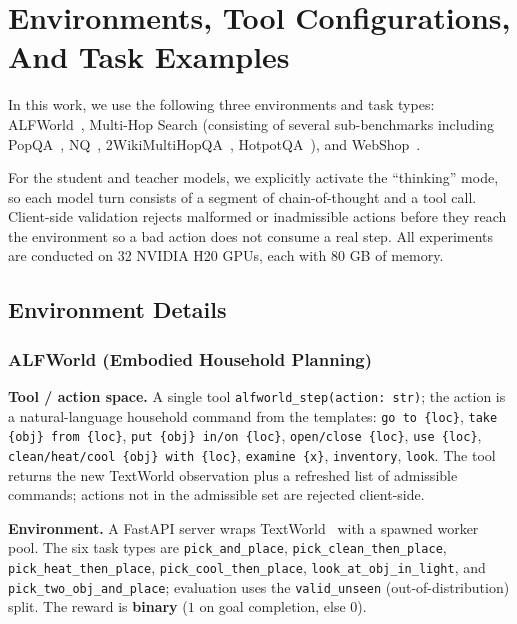 ﻿\newpage
\appendix


\section{Environments, Tool Configurations, And Task Examples}
\label{app:envs}

In this work, we use the following three environments and task types:
ALFWorld~\citep{shridhar2021alfworld}, Multi-Hop Search (consisting of several sub-benchmarks including PopQA~\citep{mallen2023popqa}, NQ~\citep{kwiatkowski2019natural}, 2WikiMultiHopQA~\citep{ho2020twowiki}, HotpotQA~\citep{yang2018hotpotqa}), and WebShop~\citep{yao2022webshop}.

For the student and teacher models, we explicitly activate the ``thinking'' mode, so each model turn consists of a segment of chain-of-thought and a tool call.
Client-side validation rejects malformed or inadmissible actions before they reach the
environment so a bad action does not consume a real step.
All experiments are conducted on 32 NVIDIA H20 GPUs, each with 80 GB of memory.

\subsection{Environment Details}

\subsubsection{ALFWorld (Embodied Household Planning)}
\label{app:envs:alfworld}

\textbf{Tool / action space.} A single tool \texttt{alfworld\_step(action: str)}; the
action is a natural-language household command from the templates: \texttt{go to
\{loc\}}, \texttt{take \{obj\} from \{loc\}}, \texttt{put \{obj\} in/on \{loc\}},
\texttt{open/close \{loc\}}, \texttt{use \{loc\}}, \texttt{clean/heat/cool \{obj\} with
\{loc\}}, \texttt{examine \{x\}}, \texttt{inventory}, \texttt{look}. The tool returns
the new TextWorld observation plus a refreshed list of admissible commands; actions not
in the admissible set are rejected client-side.

\textbf{Environment.} A FastAPI server wraps TextWorld~\citep{cote2018textworld} with a
spawned worker pool. The six task types are \texttt{pick\_and\_place},
\texttt{pick\_clean\_then\_place}, \texttt{pick\_heat\_then\_place},
\texttt{pick\_cool\_then\_place}, \texttt{look\_at\_obj\_in\_light}, and
\texttt{pick\_two\_obj\_and\_place}; evaluation uses the \texttt{valid\_unseen}
(out-of-distribution) split. The reward is \textbf{binary} ($1$ on goal completion,
else $0$).

